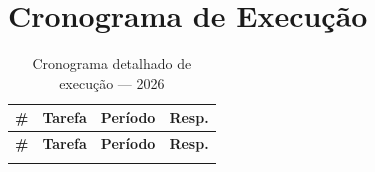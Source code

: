 \documentclass[12pt, a4paper]{article}
\begin{document}
\section{Cronograma de Execução}

\begin{longtable}{%
  >{\centering\arraybackslash}p{0.7cm}
  p{7.2cm}
  p{3.4cm}
  >{\centering\arraybackslash}p{1.4cm}}

  \caption{Cronograma detalhado de execução --- 2026}
  \label{tab:cronograma} \\

  \toprule
  \rowcolor{ifcGreen!20}
  \textbf{\#} & \textbf{Tarefa} & \textbf{Período} & \textbf{Resp.} \\
  \midrule
  \endfirsthead

  \toprule
  \rowcolor{ifcGreen!20}
  \textbf{\#} & \textbf{Tarefa} & \textbf{Período} & \textbf{Resp.} \\
  \midrule
  \endhead

  \bottomrule
  \endfoot


\end{longtable}
\end{document}
